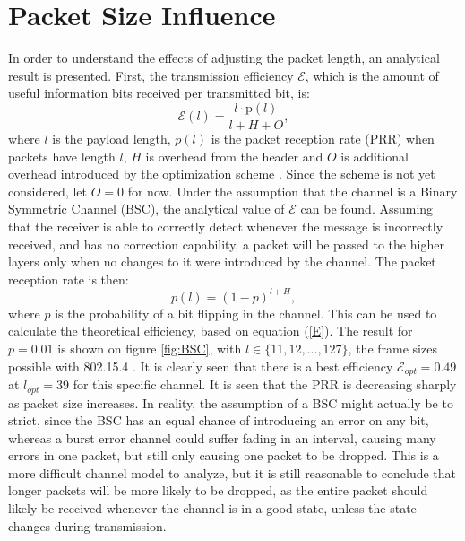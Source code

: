 \section{Packet Size Influence}\label{sec:pacSizeInf}
In order to understand the effects of adjusting the packet length, an analytical result is presented. First, the transmission efficiency $\mathcal{E}$, which is the amount of useful information bits received per transmitted bit, is:
\begin{equation}
\mathcal{E}(l) = \frac{l\cdot \text{p}(l)}{l + H + O},\label{E}
\end{equation}
where $l$ is the payload length, $p(l)$ is the packet reception rate (PRR) when packets have length $l$, $H$ is overhead from the header and $O$ is additional overhead introduced by the optimization scheme \cite{DPLCpaper}. Since the scheme is not yet considered, let $O=0$ for now. Under the assumption that the channel is a Binary Symmetric Channel (BSC), the analytical value of $\mathcal{E}$ can be found. Assuming that the receiver is able to correctly detect whenever the message is incorrectly received, and has no correction capability, a packet will be passed to the higher layers only when no changes to it were introduced by the channel. The packet reception rate is then:
\begin{equation}
p(l) = (1 - p)^{l+H},
\end{equation}
where $p$ is the probability of a bit flipping in the channel. This can be used to calculate the theoretical efficiency, based on equation (\ref{E}). The result for $p=0.01$ is shown on figure \ref{fig:BSC}, with $l\in \{11,12,...,127\}$, the frame sizes possible with 802.15.4 \cite{CC2420}. It is clearly seen that there is a best efficiency $\mathcal{E}_{opt} = 0.49$ at $l_{opt} = 39$ for this specific channel. It is seen that the PRR is decreasing sharply as packet size increases. In reality, the assumption of a BSC might actually be to strict, since the BSC has an equal chance of introducing an error on any bit, whereas a burst error channel could suffer fading in an interval, causing many errors in one packet, but still only causing one packet to be dropped. This is a more difficult channel model to analyze, but it is still reasonable to conclude that longer packets will be more likely to be dropped, as the entire packet should likely be received whenever the channel is in a good state, unless the state changes during transmission.
